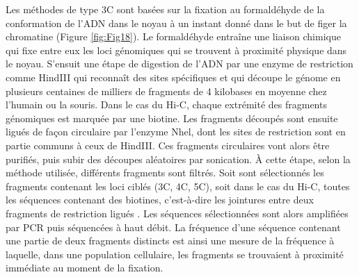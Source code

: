 Les méthodes de type \acrshort{3C} sont basées sur la fixation au formaldéhyde de la conformation de l’ADN dans le noyau à un instant donné dans le but de figer la chromatine (Figure \ref{fig:Fig18}). Le formaldéhyde entraîne une liaison chimique qui fixe entre eux les loci génomiques qui se trouvent à proximité physique dans le noyau. S'ensuit une étape de digestion de l’ADN par une enzyme de restriction comme HindIII qui reconnaît des sites spécifiques et qui découpe le génome en plusieurs centaines de milliers de fragments de 4 kilobases en moyenne chez l’humain ou la souris. Dans le cas du \acrshort{Hi-C}, chaque extrémité des fragments génomiques est marquée par une biotine. Les fragments découpés sont ensuite ligués de façon circulaire par l’enzyme Nhel, dont les sites de restriction sont en partie communs à ceux de HindIII. Ces fragments circulaires vont alors être purifiés, puis subir des découpes aléatoires par sonication. \`A cette étape, selon la méthode utilisée, différents fragments sont filtrés. Soit sont sélectionnés les fragments contenant les loci ciblés (\acrshort{3C}, 4C, 5C), soit dans le cas du \acrshort{Hi-C}, toutes les séquences contenant des biotines, c’est-à-dire les jointures entre deux fragments de restriction ligués \citep{lieberman-aiden_comprehensive_2009}. Les séquences sélectionnées sont alors amplifiées par PCR puis séquencées à haut débit. La fréquence d'une séquence contenant une partie de deux fragments distincts est ainsi une mesure de la fréquence à laquelle, dans une population cellulaire, les fragments se trouvaient à proximité immédiate au moment de la fixation. \\



